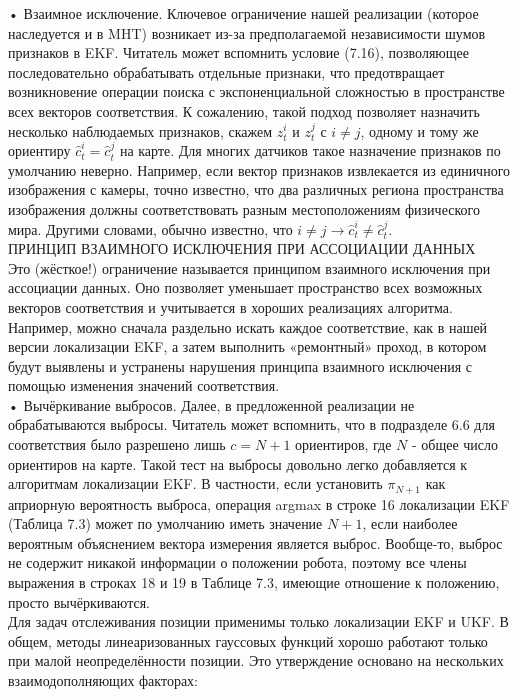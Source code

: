 \documentclass[10pt,a4paper]{article}
\begin{document}
• Взаимное исключение. Ключевое ограничение нашей реализации (которое наследуется и в MHT) возникает из-за предполагаемой независимости шумов признаков в EKF. Читатель может вспомнить условие (7.16), позволяющее последовательно обрабатывать отдельные признаки, что предотвращает возникновение операции поиска с экспоненциальной сложностью в пространстве всех векторов соответствия.
К сожалению, такой подход позволяет назначить несколько наблюдаемых признаков, скажем $z_t^i$ и $z_t^j$ с $i\neq j$, одному и тому же ориентиру $\hat{c}_t^i=\hat{c}_t^j$ на карте. Для многих датчиков такое назначение признаков по умолчанию неверно. Например, если вектор признаков извлекается из единичного изображения с камеры, точно известно, что два различных региона пространства изображения должны соответствовать разным местоположениям физического мира.
Другими словами, обычно известно, что $i\neq j\longrightarrow\hat{c}_t^i\neq\hat{c}_t^j$.\\
ПРИНЦИП ВЗАИМНОГО ИСКЛЮЧЕНИЯ ПРИ АССОЦИАЦИИ ДАННЫХ\\
Это (жёсткое!) ограничение называется принципом взаимного исключения при ассоциации данных. Оно позволяет уменьшает пространство всех возможных векторов соответствия и учитывается в хороших реализациях алгоритма. Например, можно сначала раздельно искать каждое соответствие, как в нашей версии локализации EKF, а затем выполнить «ремонтный» проход, в котором будут выявлены и устранены нарушения принципа взаимного исключения с помощью изменения значений соответствия.\\

• Вычёркивание выбросов. Далее, в предложенной реализации не обрабатываются выбросы. Читатель может вспомнить, что в подразделе 6.6 для соответствия было разрешено лишь $c = N + 1$ ориентиров, где $N$ - общее число ориентиров на карте. Такой тест на выбросы довольно легко добавляется к алгоритмам локализации EKF. В частности, если установить $\pi_{N+1}$ как априорную вероятность выброса, операция argmax в строке 16 локализации EKF (Таблица 7.3) может по умолчанию иметь значение $N +1$, если наиболее вероятным объяснением вектора измерения является выброс. Вообще-то, выброс не содержит никакой информации о положении робота, поэтому все члены выражения в строках 18 и 19 в Таблице 7.3, имеющие отношение к положению, просто вычёркиваются.\\

Для задач отслеживания позиции применимы только локализации EKF и UKF.
В общем, методы линеаризованных гауссовых функций хорошо работают только при малой неопределённости позиции. Это утверждение основано на нескольких взаимодополняющих факторах:\\
\end{document}

